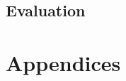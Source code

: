 \documentclass[12pt]{report}
\begin{document}
\chapter{Evaluation}

	

\part{Appendices}

	\appendix
	

	
	
	

	
	

	
	

	
	

	
	

	
	

	
	
\end{document}
